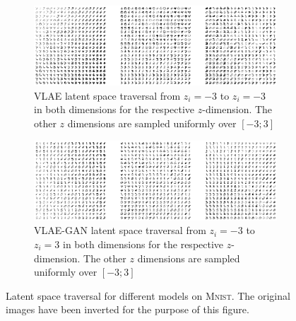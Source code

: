 \begin{figure}
    \ContinuedFloat
    \centering
    \begin{subfigure}{\textwidth}
        \centering
        \includegraphics[width=\textwidth]{images/latent_space_traversals/vlae_mnist.png}
        \caption{\ac{VLAE} latent space traversal from $z_i=-3$ to $z_i=-3$ in both dimensions for the respective $z$-dimension. The other $z$ dimensions are sampled uniformly over $[-3; 3]$}
        \label{subfig:vlae_mnist_latent_space_traversal}
    \end{subfigure}
    \begin{subfigure}{\textwidth}
        \centering
        \includegraphics[width=\textwidth]{images/latent_space_traversals/vlae_gan_mnist.png}
        \caption{\ac{VLAE}-\ac{GAN} latent space traversal from $z_i=-3$ to $z_i=3$ in both dimensions for the respective $z$-dimension. The other $z$ dimensions are sampled uniformly over $[-3; 3]$}
        \label{subfig:vlae_gan_mnist_latent_space_traversal}
    \end{subfigure}
    \caption[Models on \textsc{Mnist} - Latent Space Traversal]{Latent space traversal for different models on \textsc{Mnist}. The original images have been inverted for the purpose of this figure.}
    \label{fig:mnist_latent_space_traversal}
\end{figure}

